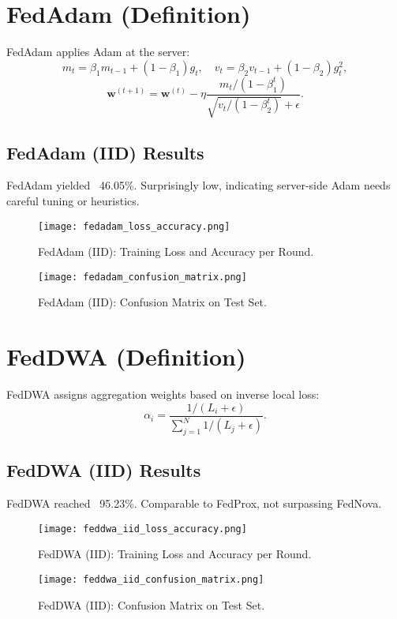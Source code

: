 \documentclass[12pt,a4paper]{report}
\begin{document}
\section{FedAdam (Definition)}

FedAdam applies Adam at the server:
\[
m_t = \beta_1 m_{t-1} + (1-\beta_1)g_t,\quad v_t = \beta_2 v_{t-1} + (1-\beta_2)g_t^2,
\]
\[
\mathbf{w}^{(t+1)} = \mathbf{w}^{(t)} - \eta \frac{m_t / (1-\beta_1^t)}{\sqrt{v_t/(1-\beta_2^t)}+\epsilon}.
\]

\subsection{FedAdam (IID) Results}

FedAdam yielded ~46.05\%. Surprisingly low, indicating server-side Adam needs careful tuning or heuristics.

\begin{figure}[H]
	\centering
	\texttt{[image: fedadam\_loss\_accuracy.png]}
	\caption{FedAdam (IID): Training Loss and Accuracy per Round.}
\end{figure}

\begin{figure}[H]
	\centering
	\texttt{[image: fedadam\_confusion\_matrix.png]}
	\caption{FedAdam (IID): Confusion Matrix on Test Set.}
\end{figure}

\section{FedDWA (Definition)}

FedDWA assigns aggregation weights based on inverse local loss:
\[
\alpha_i = \frac{1/(L_i + \epsilon)}{\sum_{j=1}^{N} 1/(L_j + \epsilon)}.
\]

\subsection{FedDWA (IID) Results}

FedDWA reached ~95.23\%. Comparable to FedProx, not surpassing FedNova.

\begin{figure}[H]
	\centering
	\texttt{[image: feddwa\_iid\_loss\_accuracy.png]}
	\caption{FedDWA (IID): Training Loss and Accuracy per Round.}
\end{figure}

\begin{figure}[H]
	\centering
	\texttt{[image: feddwa\_iid\_confusion\_matrix.png]}
	\caption{FedDWA (IID): Confusion Matrix on Test Set.}
\end{figure}
\end{document}
